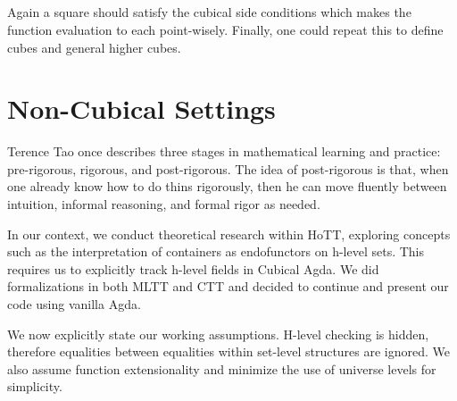 \begin{code}%
%
\>[2]\AgdaSpace{}%
\AgdaSymbol{:}\AgdaSpace{}%
\AgdaSymbol{(}\AgdaSpace{}%
\AgdaSymbol{:}\AgdaSpace{}%
\AgdaSymbol{)}\AgdaSpace{}%
\AgdaSymbol{\{}\AgdaSpace{}%
\AgdaSpace{}%
\AgdaSpace{}%
\AgdaSpace{}%
\AgdaSymbol{:}\AgdaSpace{}%
\AgdaSymbol{\}}\<%
\\
\>[2][@{}l@{\AgdaIndent{0}}]%
\>[4]\AgdaSpace{}%
\AgdaSpace{}%
\AgdaSpace{}%
\AgdaSpace{}%
\AgdaSpace{}%
\AgdaSpace{}%
\AgdaSpace{}%
\AgdaSpace{}%
\AgdaSpace{}%
\<%
\\
%
\>[4]\AgdaSpace{}%
\AgdaSpace{}%
\AgdaSpace{}%
\AgdaSpace{}%
\AgdaSpace{}%
\AgdaSpace{}%
\AgdaSpace{}%
\AgdaSpace{}%
\AgdaSpace{}%
\<%
\\
%
\>[4]\AgdaSpace{}%
\<%
\\
%
\>[2]\AgdaSpace{}%
\AgdaSpace{}%
\AgdaSpace{}%
\AgdaSpace{}%
\AgdaSpace{}%
\AgdaSpace{}%
\AgdaSymbol{=}\AgdaSpace{}%
\AgdaSpace{}%
\AgdaSpace{}%
\AgdaSpace{}%
\AgdaSpace{}%
\<%
\end{code}

Again a square  should satisfy the cubical side conditions which makes the function evaluation to each  point-wisely. Finally, one could repeat this to define cubes and general higher cubes.

\section{Non-Cubical Settings}

Terence Tao once describes three stages in mathematical learning and practice: pre-rigorous, rigorous, and post-rigorous. The idea of post-rigorous is that, when one already know how to do thins rigorously, then he can move fluently between intuition, informal reasoning, and formal rigor as needed.

In our context, we conduct theoretical research within HoTT, exploring concepts such as the interpretation of containers as endofunctors on h-level sets. This requires us to explicitly track h-level fields in Cubical Agda. We did formalizations in both MLTT and CTT and decided to continue and present our code using vanilla Agda.

We now explicitly state our working assumptions. H-level checking is hidden, therefore equalities between equalities within set-level structures are ignored. We also assume function extensionality and minimize the use of universe levels for simplicity.